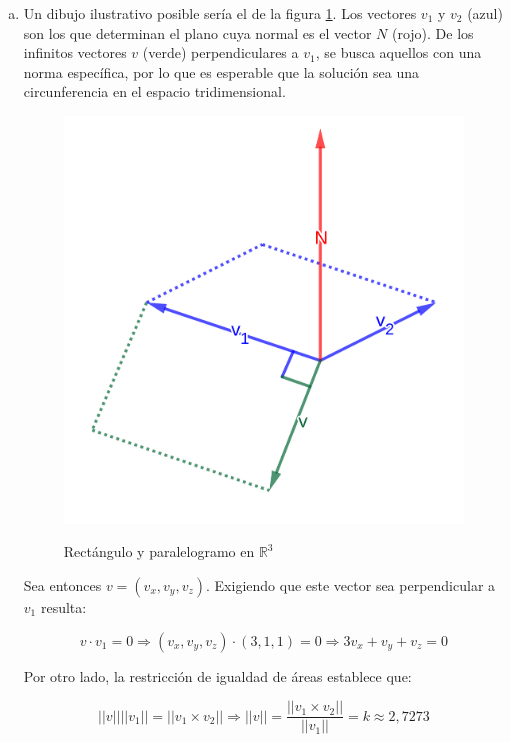 \documentclass{article}
\renewcommand{\Bbb}{\mathbb}
\begin{document}
\begin{enumerate}[(a)]
\item Un dibujo ilustrativo posible sería el de la figura \ref{fig:1-9-d}. Los vectores $v_1$ y $v_2$ (azul) son los que determinan el plano cuya normal es el vector $N$ (rojo). De los infinitos vectores $v$ (verde) perpendiculares a $v_1$, se busca aquellos con una norma específica, por lo que es esperable que la solución sea una circunferencia en el espacio tridimensional. 

\begin{figure}[ht]
\caption{Rectángulo y paralelogramo en $\Bbb R^3$}
\includegraphics[scale=1]{img/ejercicios/1/9-d.png} 
\centering
\label{fig:1-9-d}
\end{figure}

Sea entonces $v = (v_x, v_y, v_z)$. Exigiendo que este vector sea perpendicular a $v_1$ resulta:

\begin{equation}
v \cdot v_1 = 0 \Rightarrow (v_x, v_y, v_z) \cdot (3, 1, 1) = 0 \Rightarrow 3 v_x + v_y + v_z = 0
\end{equation}

Por otro lado, la restricción de igualdad de áreas establece que:

\begin{equation}
||v|| ||v_1|| = ||v_1 \times v_2|| \Rightarrow ||v|| = \frac{||v_1 \times v_2||}{||v_1||} = k \approx 2,7273
\end{equation}


\end{enumerate}
\end{document}

